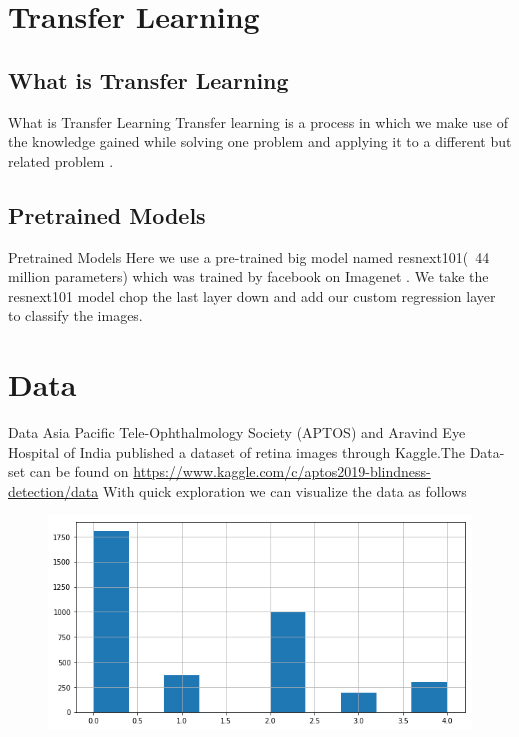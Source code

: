 \documentclass[10pt]{beamer}
\begin{document}
			
	\section{Transfer Learning}
		\subsection{What is Transfer Learning}
			\begin{frame}{What is Transfer Learning}
				Transfer learning is a process in which we make use of the knowledge gained while solving one problem and applying it to a different but related problem .
			\end{frame}
		\subsection{Pretrained Models}
			\begin{frame}{Pretrained Models}
			Here we use a pre-trained big model named resnext101(~44 million parameters) which was trained by facebook on Imagenet .
We take the resnext101 model chop the last layer down and add our custom regression layer to classify the images.
			\end{frame}
		\section{Data}
		\begin{frame}{Data}
			Asia Pacific Tele-Ophthalmology Society (APTOS) and Aravind Eye Hospital of India published a dataset of retina images through Kaggle.The Data-set can be found on 
		\url{https://www.kaggle.com/c/aptos2019-blindness-detection/data}
		With quick exploration we can visualize the data as follows
		\begin{figure}
			\includegraphics[width=\linewidth]{images/DataLabels.png}
		\end{figure}
		
		\end{frame}
\end{document}
